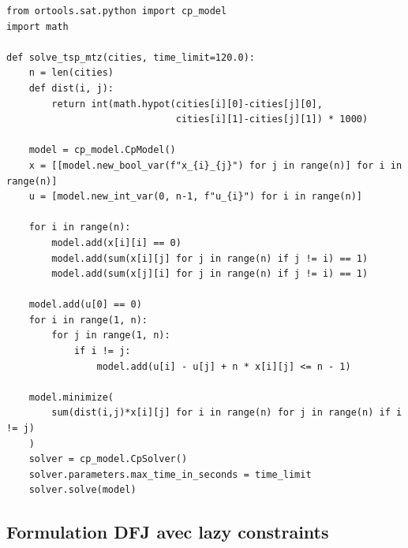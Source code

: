 \documentclass[12pt, a4paper]{article}
\begin{document}
\begin{lstlisting}[caption={ILP MTZ --- OR-Tools CP-SAT}]
from ortools.sat.python import cp_model
import math

def solve_tsp_mtz(cities, time_limit=120.0):
    n = len(cities)
    def dist(i, j):
        return int(math.hypot(cities[i][0]-cities[j][0],
                              cities[i][1]-cities[j][1]) * 1000)

    model = cp_model.CpModel()
    x = [[model.new_bool_var(f"x_{i}_{j}") for j in range(n)] for i in range(n)]
    u = [model.new_int_var(0, n-1, f"u_{i}") for i in range(n)]

    for i in range(n):
        model.add(x[i][i] == 0)
        model.add(sum(x[i][j] for j in range(n) if j != i) == 1)
        model.add(sum(x[j][i] for j in range(n) if j != i) == 1)

    model.add(u[0] == 0)
    for i in range(1, n):
        for j in range(1, n):
            if i != j:
                model.add(u[i] - u[j] + n * x[i][j] <= n - 1)

    model.minimize(
        sum(dist(i,j)*x[i][j] for i in range(n) for j in range(n) if i != j)
    )
    solver = cp_model.CpSolver()
    solver.parameters.max_time_in_seconds = time_limit
    solver.solve(model)
\end{lstlisting}

\subsection{Formulation DFJ avec lazy constraints}
\end{document}
